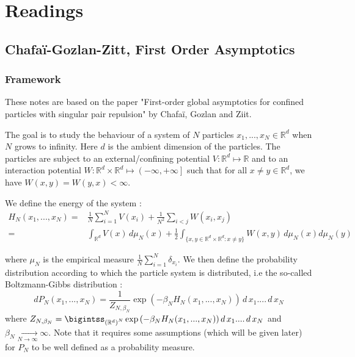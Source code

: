 \documentclass[a4paper,12pt]{report}
\begin{document}
\chapter{Readings}

\section{Chafaï-Gozlan-Zitt, First Order Asymptotics}\label{Chafaï-Gozlan-Zitt}

\subsection{Framework}

These notes are based on the paper "First-order global asymptotics for confined particles with singular pair repulsion" by Chafaï, Gozlan and Ziit. \cite{chafai-gozlan-zitt}

The goal is to study the behaviour of a system of $N$ particles $x_1, ..., x_N \in \mathbb{R}^{d}$ when $N$ grows to infinity. Here $d$ is the ambient dimension of the particles. The particles are subject to an external/confining potential $V : \mathbb{R}^{d} \longmapsto \mathbb{R}$ and to an interaction potential $W : \mathbb{R}^{d} \times \mathbb{R}^{d} \longmapsto \left(-\infty, +\infty\right]$ such that for all $x \neq y \in \mathbb{R}^{d}$, we have $W(x, y) = W(y, x) < \infty$.

We define the energy of the system :
\begin{align*}
    H_{N}\left(x_1, ..., x_N\right) =& \frac{1}{N}\sum\limits_{i =1}^{N} V(x_i) + \frac{1}{N^2}\sum\limits_{i < j} W(x_i, x_j)\\
    =& \int_{\mathbb{R}^{d}} V(x) \,d\mu_{N}(x) + \frac{1}{2} \int_{\{x, y \in \mathbb{R}^{d}\times \mathbb{R}^{d} : x \neq y\}} W(x, y)\, d\mu_{N}(x) d\mu_{N}(y) 
\end{align*}

where $\mu_{N}$ is the empirical measure $\frac{1}{N}\sum\limits_{i=1}^{N} \delta_{x_i}$. We then define the probability distribution according to which the particle system is distributed, i.e the so-called Boltzmann-Gibbs distribution :
\[dP_{N}(x_1, ..., x_N) = \frac{1}{Z_{N, \beta_{N}}} \exp{\left(-\beta_{N} H_{N}(x_1, ..., x_N)\right)}\,d\,x_{1}....\,d\,x_{N}\]
where $Z_{N, \beta_{N}} = \bigintss_{\left(\mathbb{R}^{d}\right)^{N}} \exp{\left(-\beta_{N} H_{N}(x_1, ..., x_N)\right)}\,d\,x_{1}....\,d\,x_{N}$ and $\beta_{N} \underset{N \longrightarrow \infty}{\longrightarrow} \infty$. Note that it requires some assumptions (which will be given later) for $P_{N}$ to be well defined as a probability measure.
\vspace{0.5cm}
\end{document}
